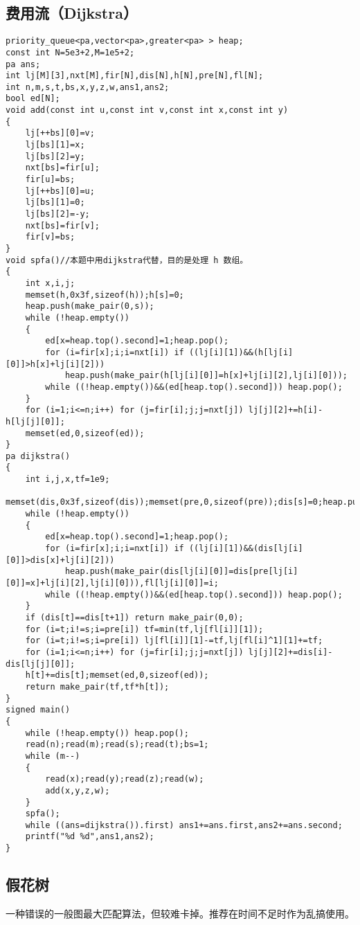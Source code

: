 \documentclass[12pt]{ctexart}
\begin{document}
\subsection{费用流（Dijkstra）}

\begin{lstlisting}
priority_queue<pa,vector<pa>,greater<pa> > heap;
const int N=5e3+2,M=1e5+2;
pa ans;
int lj[M][3],nxt[M],fir[N],dis[N],h[N],pre[N],fl[N];
int n,m,s,t,bs,x,y,z,w,ans1,ans2;
bool ed[N];
void add(const int u,const int v,const int x,const int y)
{
	lj[++bs][0]=v;
	lj[bs][1]=x;
	lj[bs][2]=y;
	nxt[bs]=fir[u];
	fir[u]=bs;
	lj[++bs][0]=u;
	lj[bs][1]=0;
	lj[bs][2]=-y;
	nxt[bs]=fir[v];
	fir[v]=bs;
}
void spfa()//本题中用dijkstra代替，目的是处理 h 数组。
{
	int x,i,j;
	memset(h,0x3f,sizeof(h));h[s]=0;
	heap.push(make_pair(0,s));
	while (!heap.empty())
	{
		ed[x=heap.top().second]=1;heap.pop();
		for (i=fir[x];i;i=nxt[i]) if ((lj[i][1])&&(h[lj[i][0]]>h[x]+lj[i][2]))
			heap.push(make_pair(h[lj[i][0]]=h[x]+lj[i][2],lj[i][0]));
		while ((!heap.empty())&&(ed[heap.top().second])) heap.pop();
	}
	for (i=1;i<=n;i++) for (j=fir[i];j;j=nxt[j]) lj[j][2]+=h[i]-h[lj[j][0]];
	memset(ed,0,sizeof(ed));
}
pa dijkstra()
{
	int i,j,x,tf=1e9;
	memset(dis,0x3f,sizeof(dis));memset(pre,0,sizeof(pre));dis[s]=0;heap.push(make_pair(0,s));
	while (!heap.empty())
	{
		ed[x=heap.top().second]=1;heap.pop();
		for (i=fir[x];i;i=nxt[i]) if ((lj[i][1])&&(dis[lj[i][0]]>dis[x]+lj[i][2]))
			heap.push(make_pair(dis[lj[i][0]]=dis[pre[lj[i][0]]=x]+lj[i][2],lj[i][0])),fl[lj[i][0]]=i;
		while ((!heap.empty())&&(ed[heap.top().second])) heap.pop();
	}
	if (dis[t]==dis[t+1]) return make_pair(0,0);
	for (i=t;i!=s;i=pre[i]) tf=min(tf,lj[fl[i]][1]);
	for (i=t;i!=s;i=pre[i]) lj[fl[i]][1]-=tf,lj[fl[i]^1][1]+=tf;
	for (i=1;i<=n;i++) for (j=fir[i];j;j=nxt[j]) lj[j][2]+=dis[i]-dis[lj[j][0]];
	h[t]+=dis[t];memset(ed,0,sizeof(ed));
	return make_pair(tf,tf*h[t]);
}
signed main()
{
	while (!heap.empty()) heap.pop();
	read(n);read(m);read(s);read(t);bs=1;
	while (m--)
	{
		read(x);read(y);read(z);read(w);
		add(x,y,z,w);
	}
	spfa();
	while ((ans=dijkstra()).first) ans1+=ans.first,ans2+=ans.second;
	printf("%d %d",ans1,ans2);
}
\end{lstlisting}



\subsection{假花树}

一种错误的一般图最大匹配算法，但较难卡掉。推荐在时间不足时作为乱搞使用。
\end{document}
